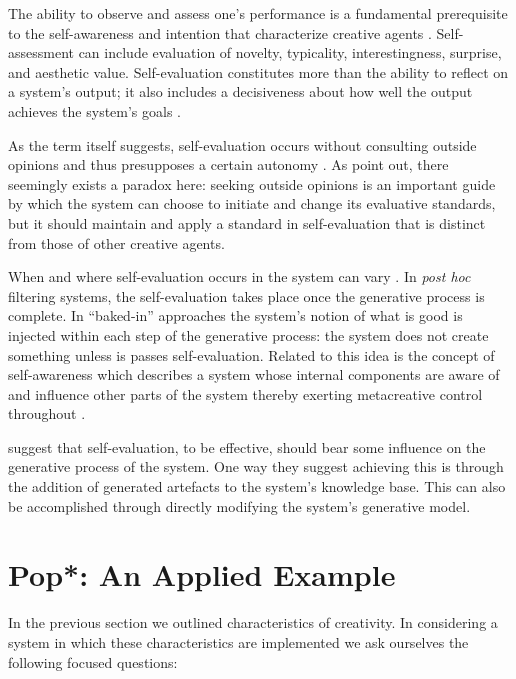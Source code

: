 \documentclass[phd,electronic,oneside,twosidetoc,letterpaper,chaptercenter,parttop,lol,lof,lot]{byumsphd}
\begin{document}
The ability to observe and assess one's performance is a fundamental prerequisite to the self-awareness and intention that characterize creative agents \citep{Ackerman2017TeachingCreativity}. Self-assessment can include evaluation of novelty, typicality, interestingness, surprise, and aesthetic value. Self-evaluation constitutes more than the ability to reflect on a system's output; it also includes a decisiveness about how well the output achieves the system's goals \citep{Ventura2016}.

As the term itself suggests, self-evaluation occurs without consulting outside opinions and thus presupposes a certain autonomy \citep{Jennings2010DevelopingIntelligence}. As \cite{Ackerman2017TeachingCreativity} point out, there seemingly exists a paradox here: seeking outside opinions is an important guide by which the system can choose to initiate and change its evaluative standards, but it should maintain and apply a standard in self-evaluation that is distinct from those of other creative agents.

When and where self-evaluation occurs in the system can vary \citep{Ventura2016}. In \textit{post hoc} filtering systems, the self-evaluation takes place once the generative process is complete. In ``baked-in'' approaches the system's notion of what is good is injected within each step of the generative process: the system does not create something unless is passes self-evaluation. Related to this idea is the concept of self-awareness which describes a system whose internal components are aware of and influence other parts of the system thereby exerting metacreative control throughout \citep{linkola2017aspects}.

\cite{perez2004three} suggest that self-evaluation, to be effective, should bear some influence on the generative process of the system. One way they suggest achieving this is through the addition of generated artefacts to the system's knowledge base. This can also be accomplished through directly modifying the system's generative model.

\section{Pop*: An Applied Example}

In the previous section we outlined characteristics of creativity. In considering a system in which these characteristics are implemented we ask ourselves the following focused questions:
\end{document}
